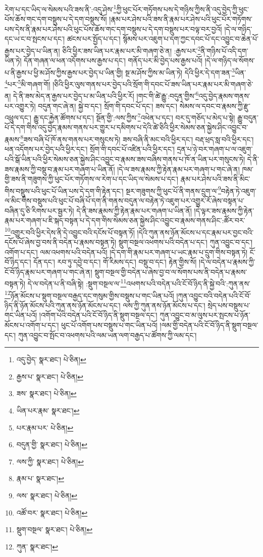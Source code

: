རེག་པ་དང་ཡིད་ལ་སེམས་པའི་ཟས་ནི་:འདུ་ཤེས་\footnote{འདུ་བྱེད་  སྣར་ཐང་།  པེ་ཅིན། }ཀྱི་ཕུང་པོར་གཏོགས་པས་དེ་གཉིས་ཀྱིས་ནི་འདུ་བྱེད་ཀྱི་ཕུང་པོས་ཆོས་གང་དག་བསྡུས་པ་དེ་དག་བསྡུས་སོ། །རྣམ་པར་ཤེས་པའི་ཟས་ནི་རྣམ་པར་ཤེས་པའི་ཕུང་པོར་གཏོགས་པས་དེས་ནི་རྣམ་པར་ཤེས་པའི་ཕུང་པོས་ཆོས་གང་དག་བསྡུས་པ་དེ་དག་བསྡུས་པར་བལྟ་བར་བྱའོ། །དེ་ལ་གཉིད་དང་ཡ་ང་བ་སྤངས་པ་དང་། ཚངས་པར་སྤྱོད་པ་དང་། སྙོམས་པར་འཇུག་པ་དག་ཀྱང་དབང་པོ་དང་འབྱུང་བ་ཆེན་པོ་རྒྱས་པར་བྱེད་པ་ཡིན་ན། ཅིའི་ཕྱིར་ཟས་ཡིན་པར་རྣམ་པར་མི་གཞག་ཅེ་ན། :རྒྱས་པར་\footnote{རྒྱས་པ་  སྣར་ཐང་།  པེ་ཅིན། }ནི་གཉིས་པོ་འདི་དག་ཡིན་ཏེ། དོན་གཞན་ལ་ཕན་འདོགས་པས་རྒྱས་པ་དང་། གནོད་པར་མི་བྱེད་པས་རྒྱས་པའོ། །དེ་ལ་གཉིད་ལ་སོགས་པ་ནི་རྒྱས་པ་ཕྱི་མ་ཤོས་ཀྱིས་རྒྱས་པར་བྱེད་པ་ཡིན་གྱི། སྔ་མ་ཤོས་ཀྱིས་མ་ཡིན་ཏེ། དེའི་ཕྱིར་དེ་དག་ཟན་\footnote{ཟས་  སྣར་ཐང་།  པེ་ཅིན། }ཡིན་\footnote{ཡིན་པར་རྣམ་  སྣར་ཐང་། }པར་\footnote{པར་རྣམ་པར་  པེ་ཅིན། }མི་གཞག་གོ། །ཅིའི་ཕྱིར་ལུས་གནས་པར་བྱེད་པའི་སྲོག་གི་དབང་པོ་ཟས་ཡིན་པར་རྣམ་པར་མི་གཞག་ཅེ་ན། དེ་ནི་ཟས་མེད་ན་རྒྱས་པར་བྱེད་པ་མ་ཡིན་པའི་ཕྱིར་རོ། །གང་གི་ཚེ་རྒྱུ་:བདུན་གྱིས་\footnote{བདུན་གྱི་  སྣར་ཐང་།  པེ་ཅིན། }འདུ་བྱེད་རྣམས་གནས་པར་འགྱུར་ཏེ། བདུན་གང་ཞེ་ན། སྐྱེ་བ་དང་། སྲོག་གི་དབང་པོ་དང་། ཟས་དང་། སེམས་ལ་དབང་བ་རྣམས་ཀྱི་རྫུ་འཕྲུལ་དང་། རྒྱུ་དང་རྐྱེན་ཚོགས་པ་དང་། སྔོན་གྱི་:ལས་ཀྱིས་\footnote{ལས་ཀྱི་  སྣར་ཐང་།  པེ་ཅིན། }འཕེན་པ་དང་། བར་དུ་གཅོད་པ་མེད་པ་སྟེ། རྒྱུ་བདུན་པོ་དེ་དག་གིས་འདུ་བྱེད་རྣམས་གནས་པར་གྱུར་པ་དམིགས་པ་དེའི་ཚེ་ཅིའི་ཕྱིར་སེམས་ཅན་སྐྱེས་ཤིང་འབྱུང་བ་རྣམས་\footnote{རྣམ་པ་  སྣར་ཐང་། }ཟས་བཞི་པོ་ཁོ་ནས་གནས་པར་གསུངས་ཏེ། ཟས་བཞི་ནི་མང་བའི་ཕྱིར་དང་། བརྡ་ཕྲད་སླ་བའི་ཕྱིར་དང་། ཕན་འདོགས་པར་བྱེད་པའི་ཕྱིར་དང་། སྲོག་གི་དབང་པོ་འཛིན་པའི་ཕྱིར་དང་། དྲན་པ་ཉེ་བར་གཞག་པ་ལ་འཇུག་པའི་སྒོ་ཡིན་པའི་ཕྱིར་སེམས་ཅན་སྐྱེས་ཤིང་འབྱུང་བ་རྣམས་ཟས་བཞིས་གནས་པ་ཁོ་ན་ཡིན་པར་གསུངས་ཏེ། དེ་ནི་ཟས་རྣམས་ཀྱི་བསྡུ་བ་རྣམ་པར་གཞག་པ་ཡིན་ནོ། །དེ་ལ་ཟས་རྣམས་ཀྱི་རྟེན་རྣམ་པར་གཞག་པ་གང་ཞེ་ན། ཁམ་གྱི་ཟས་ནི་གཟུགས་ཀྱི་ཕུང་པོར་གཏོགས་ལ་རེག་པ་དང་ཡིད་ལ་སེམས་པ་དང་། རྣམ་པར་ཤེས་པའི་ཟས་ནི་མིང་གིས་བསྡུས་པའི་ཕུང་པོ་ཡིན་པས་དེ་དག་གི་རྟེན་དང་། སྔར་གཟུགས་ཀྱི་ཕུང་པོ་ནི་གནས་དྲུག་ལ་\footnote{ལས་  སྣར་ཐང་།  པེ་ཅིན། }བརྟེན་ཏེ་འཇུག་ལ་མིང་གིས་བསྡུས་པའི་ཕུང་པོ་བཞི་པོ་དག་ནི་གནས་བདུན་ལ་བརྟེན་ཏེ་འཇུག་པར་འགྱུར་རོ་ཞེས་བསྟན་པ་བཞིན་དུ་ཅི་རིགས་པར་སྦྱར་ཏེ། དེ་ནི་ཟས་རྣམས་ཀྱི་རྟེན་རྣམ་པར་གཞག་པ་ཡིན་ནོ། །དེ་ལྟར་ཟས་རྣམས་ཀྱི་རྟེན་རྣམ་པར་གཞག་པ་ཇི་སྐད་བསྟན་པ་དེ་དག་གིས་སེམས་ཅན་སྐྱེས་ཤིང་འབྱུང་བ་རྣམས་གནས་ཤིང་:ཚོར་བར་\footnote{འཚོ་བར་  སྣར་ཐང་།  པེ་ཅིན། }འགྱུར་བའི་ཕྱིར་དེས་ནི་དེ་འབྱུང་བའི་དངོས་པོ་བསྟན་ཏོ། །དེའི་ཀུན་ནས་ཉོན་མོངས་པ་དང་རྣམ་པར་བྱང་བའི་དངོས་པོ་ཞེས་བྱ་བས་ནི་བདེན་པ་རྣམས་བསྟན་ཏེ། སྡུག་བསྔལ་འཕགས་པའི་བདེན་པ་དང་། ཀུན་འབྱུང་བ་དང་། འགོག་པ་དང་། ལམ་འཕགས་པའི་བདེན་པའོ། །དེ་དག་གི་རྣམ་པར་གཞག་པ་ཡང་རྣམ་པ་དྲུག་གིས་བསྟན་ཏེ། ངོ་བོ་ཉིད་དང་། དོན་དང་། རབ་ཏུ་དབྱེ་བ་དང་། གོ་རིམས་དང་། བསྡུ་བ་དང་། རྟེན་གྱིས་སོ། །དེ་ལ་བདེན་པ་རྣམས་ཀྱི་ངོ་བོ་ཉིད་རྣམ་པར་གཞག་པ་གང་ཞེ་ན། སྡུག་བསྔལ་གྱི་བདེན་པ་ཞེས་བྱ་བ་ལ་སོགས་པས་ནི་བདེན་པ་རྣམས་བསྟན་ཏེ། དེ་ལ་བདེན་པ་ནི་བཞི་སྟེ། :སྡུག་བསྔལ་ལ་\footnote{སྡུག་བསྔལ་  སྣར་ཐང་།  པེ་ཅིན། }འཕགས་པའི་བདེན་པའི་ངོ་བོ་ཉིད་ནི་སྐྱེ་བའི་:ཀུན་ནས་\footnote{ཀུན་  སྣར་ཐང་། }ཉོན་མོངས་པ་སྡུག་བསྔལ་བརྒྱད་དང་གསུམ་གྱིས་བསྡུས་པ་གང་ཡིན་པའོ། །ཀུན་འབྱུང་བའི་བདེན་པའི་ངོ་བོ་ཉིད་ནི་ཉོན་མོངས་པའི་ཀུན་ནས་ཉོན་མོངས་པ་དང་། ལས་ཀྱི་ཀུན་ནས་ཉོན་མོངས་པ་དང་། སྲེད་པས་བསྡུས་པ་གང་ཡིན་པའོ། །འགོག་པའི་བདེན་པའི་ངོ་བོ་ཉིད་ནི་སྡུག་བསྔལ་དང་། ཀུན་འབྱུང་བ་མ་ལུས་པར་སྤངས་པ་ཉོན་མོངས་པ་འགོག་པ་དང་། ཕུང་པོ་འགོག་པས་བསྡུས་པ་གང་ཡིན་པའོ། །ལམ་གྱི་བདེན་པའི་ངོ་བོ་ཉིད་ནི་སྡུག་བསྔལ་དང་། ཀུན་འབྱུང་བ་སྤོང་བ་འཕགས་པའི་ལམ་ཡན་ལག་བརྒྱད་པ་ཚོགས་ཀྱི་ལམ་དང་། 